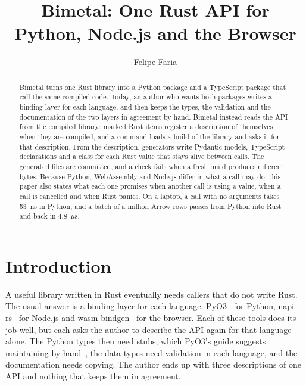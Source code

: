 \documentclass[sigconf,nonacm]{acmart}
\begin{document}
\title{Bimetal: One Rust API for Python, Node.js and the Browser}
\author{Felipe Faria}

\begin{abstract}
Bimetal turns one Rust library into a Python package and a TypeScript package that call the same compiled code. Today, an author who wants both packages writes a binding layer for each language, and then keeps the types, the validation and the documentation of the two layers in agreement by hand. Bimetal instead reads the API from the compiled library: marked Rust items register a description of themselves when they are compiled, and a command loads a build of the library and asks it for that description. From the description, generators write Pydantic models, TypeScript declarations and a class for each Rust value that stays alive between calls. The generated files are committed, and a check fails when a fresh build produces different bytes. Because Python, WebAssembly and Node.js differ in what a call may do, this paper also states what each one promises when another call is using a value, when a call is cancelled and when Rust panics. On a laptop, a call with no arguments takes 53~ns in Python, and a batch of a million Arrow rows passes from Python into Rust and back in 4.8~$\mu$s.
\end{abstract}


\maketitle

\section{Introduction}

A useful library written in Rust eventually needs callers that do not write Rust. The usual answer is a binding layer for each language: PyO3~\cite{pyo3} for Python, napi-rs~\cite{napirs} for Node.js and wasm-bindgen~\cite{wasmbindgen} for the browser. Each of these tools does its job well, but each asks the author to describe the API again for that language alone. The Python types then need stubs, which PyO3's guide suggests maintaining by hand~\cite{pyo3typing}, the data types need validation in each language, and the documentation needs copying. The author ends up with three descriptions of one API and nothing that keeps them in agreement.
\end{document}
